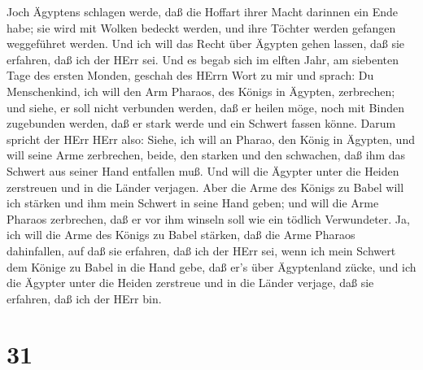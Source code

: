 Joch Ägyptens schlagen werde, daß die Hoffart ihrer Macht darinnen ein
Ende habe; sie wird mit Wolken bedeckt werden, und ihre Töchter werden
gefangen weggeführet werden.  Und ich will das Recht über
Ägypten gehen lassen, daß sie erfahren, daß ich der HErr sei.
 Und es begab sich im elften Jahr, am siebenten Tage des
ersten Monden, geschah des HErrn Wort zu mir und sprach: 
Du Menschenkind, ich will den Arm Pharaos, des Königs in Ägypten,
zerbrechen; und siehe, er soll nicht verbunden werden, daß er heilen
möge, noch mit Binden zugebunden werden, daß er stark werde und ein
Schwert fassen könne.  Darum spricht der HErr HErr also:
Siehe, ich will an Pharao, den König in Ägypten, und will seine Arme
zerbrechen, beide, den starken und den schwachen, daß ihm das Schwert
aus seiner Hand entfallen muß.  Und will die Ägypter unter
die Heiden zerstreuen und in die Länder verjagen.  Aber die
Arme des Königs zu Babel will ich stärken und ihm mein Schwert in seine
Hand geben; und will die Arme Pharaos zerbrechen, daß er vor ihm winseln
soll wie ein tödlich Verwundeter.  Ja, ich will die Arme
des Königs zu Babel stärken, daß die Arme Pharaos dahinfallen, auf daß
sie erfahren, daß ich der HErr sei, wenn ich mein Schwert dem Könige zu
Babel in die Hand gebe, daß er's über Ägyptenland zücke, 
und ich die Ägypter unter die Heiden zerstreue und in die Länder
verjage, daß sie erfahren, daß ich der HErr bin.

\hypertarget{section-30}{%
\section{31}\label{section-30}}

